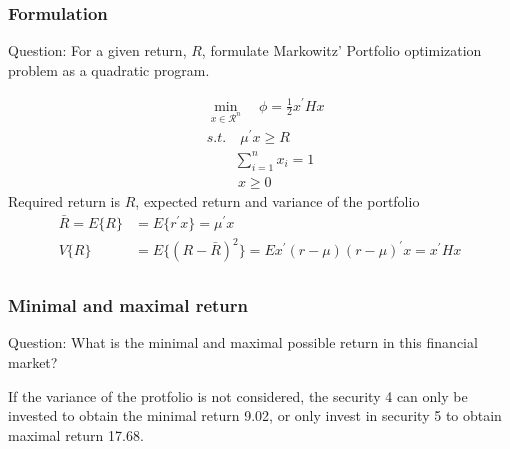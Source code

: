 \subsubsection{\bfseries Formulation}
\begin{shaded}
{ Question: For a given return, $R$, formulate Markowitz’ Portfolio optimization problem as a quadratic program.}
\end{shaded}
\begin{align*}
&\min_{x \in \mathcal{R}^n} \quad \phi=\frac{1}{2}x^{\prime}Hx \tag{3}\\
& s.t. \quad \mu^{\prime}x\ge R\\
& \quad \quad \sum_{i=1}^{n}x_i=1\\
& \quad \quad \ x \ge 0
\end{align*}
Required return is $R$, expected return and variance of the portfolio\\
\begin{align*}
\bar{R}=E\{ R\}&=E\{ r^{\prime}x\}=\mu^{\prime}x \tag{3.1}\\
 V\{ R\}&=E\{(R-\bar{R})^2 \}=E{x^{\prime}(r-\mu)(r-\mu)^{\prime}x}=x^{\prime}Hx \tag{3.2}\\
\end{align*}

\subsubsection{\bfseries Minimal and maximal return}
\begin{shaded}
{ Question: What is the minimal and maximal possible return in this financial market?}
\end{shaded}
If the variance of the protfolio is not considered, the security 4 can only be invested to obtain the minimal return 9.02, or only invest in security 5 to obtain maximal return 17.68.
